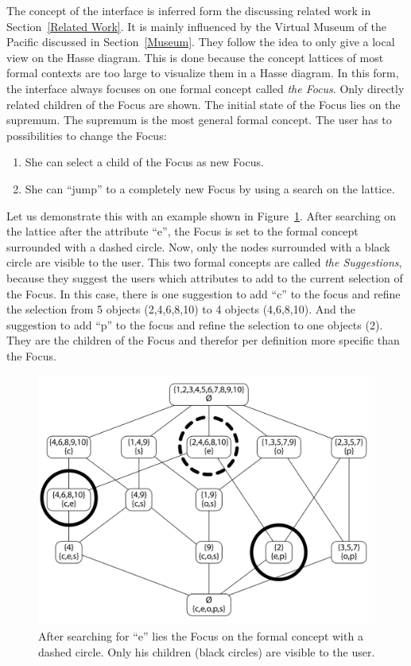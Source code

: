 \documentclass[11pt]{report}
\begin{document}
The concept of the interface is inferred form the discussing related work in Section~\ref{Related Work}. It is mainly influenced by the Virtual Museum of the Pacific discussed in Section~\ref{Museum}. They follow the idea to only give a local view on the Hasse diagram. This is done because the concept lattices of most formal contexts are too large to visualize them in a Hasse diagram. In this form, the interface always focuses on one formal concept called \textit{the Focus}. Only directly related children of the Focus are shown. The initial state of the Focus lies on the supremum. The supremum is the most general formal concept. The user has to possibilities to change the Focus:
\begin{enumerate}
	\item She can select a child of the Focus as new Focus.
	\item She can ``jump'' to a completely new Focus by using a search on the lattice.
\end{enumerate}
Let us demonstrate this with an example shown in Figure~\ref{figure:conceptExample}. After searching on the lattice after the attribute ``e'', the Focus is set to the formal concept surrounded with a dashed circle. Now, only the nodes surrounded with a black circle are visible to the user. This two formal concepts are called \textit{the Suggestions}, because they suggest the users which attributes to add to the current selection of the Focus. In this case, there is one suggestion to add ``c'' to the focus and refine the selection from 5 objects (2,4,6,8,10) to 4 objects (4,6,8,10). And the suggestion to add ``p'' to the focus and refine the selection to one objects (2). They are the children of the Focus and therefor per definition more specific than the Focus. \\

\begin{figure}[!ht]
	\centering
	\includegraphics[width=\linewidth]{images/focus}
\caption{After searching for ``e'' lies the Focus on the formal concept with a dashed circle. Only his children (black circles) are visible to the user. }
\label{figure:conceptExample}
\end{figure}
\end{document}
